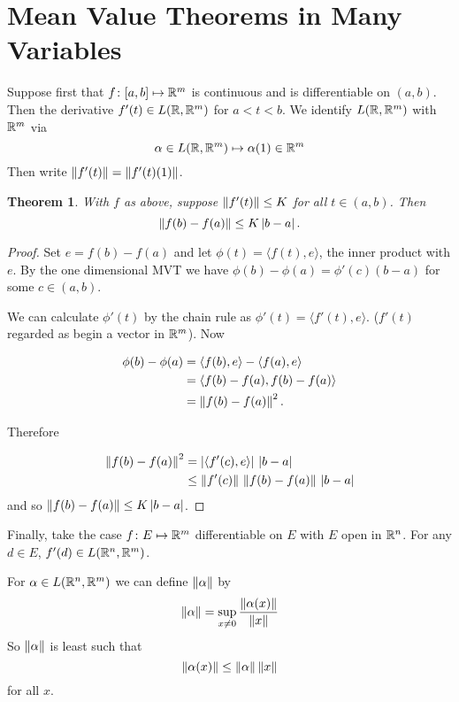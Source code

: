 \documentclass{notes}
\theoremstyle{plain}
\newtheorem{theorem}[proposition]{Theorem}
\begin{document}
\section{Mean Value Theorems in Many Variables}

Suppose first that $ f\colon [a,b] \mapsto \mathbb{R}^{m}  $ is continuous and 
is differentiable on $ (a,b) $. Then the derivative $ f'(t) \in 
L(\mathbb{R}, \mathbb{R}^{m}) $ for $ a<t<b $. We identify $ L(\mathbb{R}, \mathbb{R}^{m}) $ 
with $ \mathbb{R}^{m} $ via
\[  \alpha \in L(\mathbb{R}, \mathbb{R}^{m}) \mapsto \alpha(1) \in \mathbb{R}^{m} \]
Then write $ \left\|f'(t)\right\| = \left\|f'(t)(1)\right\| $.

\begin{theorem}\label{thm:mvt2}
With $ f $ as above, suppose $ \left\|f'(t)\right\|\leq K $ for all $ t 
\in (a,b) $. Then
\[
\left\|f(b)-f(a)\right\| \leq K \left|b-a\right|.
\]
\end{theorem}

\begin{proof}
Set $ e = f(b)-f(a) $ and let $ \phi(t) = \langle f(t),e\rangle $,
the inner  product with $ e $.
By the one dimensional MVT we have
$ \phi(b)-\phi(a)=\phi'(c)(b-a) $ for some $ c  \in (a,b) $.

We can calculate $ \phi'(t) $ by the chain rule as $\phi'(t) = \langle
f'(t),e \rangle$.  ($ f'(t) $ regarded as begin a vector in $ \mathbb{R}^{m} $).
Now

\begin{align*}
 \phi(b)-\phi(a) & = \langle f(b),e\rangle-\langle f(a),e\rangle \\
 & = \langle f(b)-f(a), f(b)-f(a)\rangle \\
  & = \left\|f(b)-f(a)\right\|^{2}.
\end{align*}

Therefore

\begin{align*}
\left\|f(b)-f(a)\right\|^{2} & = \left|\langle f'(c),e\rangle\right| \, \left|b-a\right| \\
& \leq \left\|f'(c)\right\| \, \left\|f(b)-f(a)\right\| \, \left|b-a\right|
\end{align*}
and so $ \left\|f(b)-f(a)\right\| \leq K \left|b-a\right| $.
\end{proof}

Finally, take the case $ f\colon E \mapsto \mathbb{R}^{m} $ differentiable on
$ E $ with $ E $ open in $ \mathbb{R}^{n} $.
For any $ d \in E $, $ f'(d) \in L(\mathbb{R}^{n}, \mathbb{R}^{m}) $.

For $ \alpha \in L(\mathbb{R}^{n},\mathbb{R}^{m}) $ we can define $ \left\|\alpha\right\| $ 
by
\[ \left\|\alpha\right\| = \sup_{x \neq 0} \frac{\left\|\alpha(x)\right\|}{\left\|x\right\|} \]
So $ \left\|\alpha\right\| $ is least such that
\[  \left\|\alpha(x)\right\| \leq \left\|\alpha\right\|\left\|x\right\| \] for all $ x $.
\end{document}

